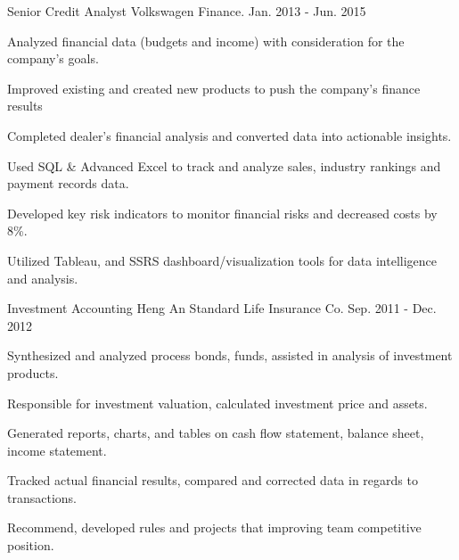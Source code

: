 \documentclass[11pt, a4paper]{awesome-cv}
\begin{document}
\begin{cventries}

  \cventry
    {Senior Credit Analyst} %
    {Volkswagen Finance.} %
    {} %
    {Jan. 2013 - Jun. 2015} %
    {
      \begin{cvitems} %
        \item {Analyzed financial data (budgets and income) with consideration for the company's goals.}
        \item {Improved existing and created new products to push the company's finance results}
        \item {Completed dealer's financial analysis and converted data into actionable insights.}
        \item {Used SQL \& Advanced Excel to track and analyze sales, industry rankings and payment records data.}
        \item {Developed key risk indicators to monitor financial risks and decreased costs by 8\%.}
        \item {Utilized Tableau, and SSRS dashboard/visualization tools for data intelligence and analysis.}
      \end{cvitems}
    }

  \cventry
    {Investment Accounting} %
    {Heng An Standard Life Insurance Co.} %
    {} %
    {Sep. 2011 - Dec. 2012} %
    {
      \begin{cvitems} %
        \item {Synthesized and analyzed process bonds, funds, assisted in analysis of investment products.}
        \item {Responsible for investment valuation, calculated investment price and assets.}
        \item {Generated reports, charts, and tables on cash flow statement, balance sheet, income statement.}
        \item {Tracked actual financial results, compared and corrected data in regards to transactions.}
        \item {Recommend, developed rules and projects that improving team competitive position.}
      \end{cvitems}
    }


\end{cventries}
\end{document}
